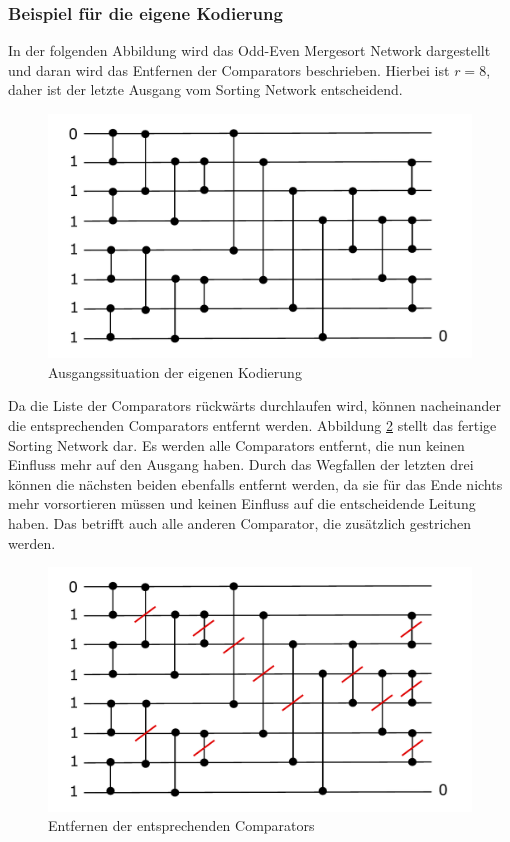\documentclass[a4,abstract=on]{scrartcl}
\begin{document}
\subsubsection*{Beispiel für die eigene Kodierung}
In der folgenden Abbildung wird das Odd-Even Mergesort Network dargestellt und daran wird das Entfernen der Comparators beschrieben. Hierbei ist $r=8$, daher ist der letzte Ausgang vom Sorting Network entscheidend.

\begin{figure}[H]
\centering
\includegraphics[width=\textwidth]{own_sorting_start.pdf}
\caption{Ausgangssituation der eigenen Kodierung}
\label{fig:ownSorting}
\end{figure}

Da die Liste der Comparators rückwärts durchlaufen wird, können nacheinander die entsprechenden Comparators entfernt werden. Abbildung \ref{fig:ownSorting1} stellt das fertige Sorting Network dar. Es werden alle Comparators entfernt, die nun keinen Einfluss mehr auf den Ausgang haben. Durch das Wegfallen der letzten drei können die nächsten beiden ebenfalls entfernt werden, da sie für das Ende nichts mehr vorsortieren müssen und keinen Einfluss auf die entscheidende Leitung haben. Das betrifft auch alle anderen Comparator, die zusätzlich gestrichen werden. 

\begin{figure}[H]
\centering
\includegraphics[width=\textwidth]{ownSorting_2.pdf}
\caption{Entfernen der entsprechenden Comparators}
\label{fig:ownSorting1}
\end{figure}
\end{document}
